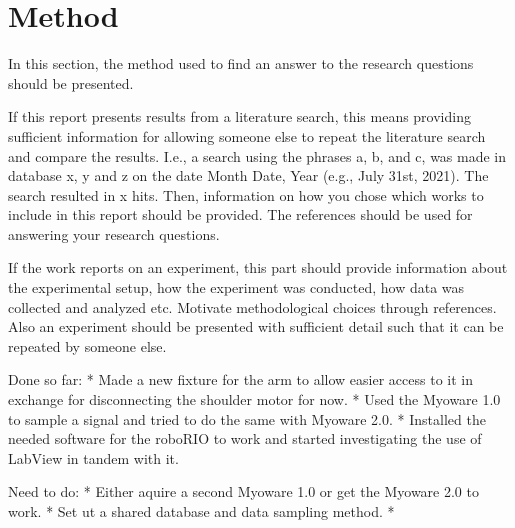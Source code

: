 \section{Method}
\label{section:method}
In this section, the method used to find an answer to the research questions should be presented. 

If this report presents results from a literature search, this means providing sufficient information 
for allowing someone else to repeat the literature search and compare the results. I.e., a search using 
the phrases a, b, and c, was made in database x, y and z on the date Month Date, Year (e.g., July 31st, 
2021). The search resulted in x hits. Then, information on how you chose which works to include in this 
report should be provided. The references should be used for answering your research questions.

If the work reports on an experiment, this part should provide information about the experimental setup, 
how the experiment was conducted, how data was collected and analyzed etc. Motivate methodological choices 
through references. Also an experiment should be presented with sufficient detail such that it can be 
repeated by someone else.



Done so far: 
* Made a new fixture for the arm to allow easier access to it in exchange for disconnecting the shoulder motor for now.
* Used the Myoware 1.0 to sample a signal and tried to do the same with Myoware 2.0.
* Installed the needed software for the roboRIO to work and started investigating the use of LabView in tandem with it.

Need to do:
* Either aquire a second Myoware 1.0 or get the Myoware 2.0 to work.
* Set ut a shared database and data sampling method.
* 